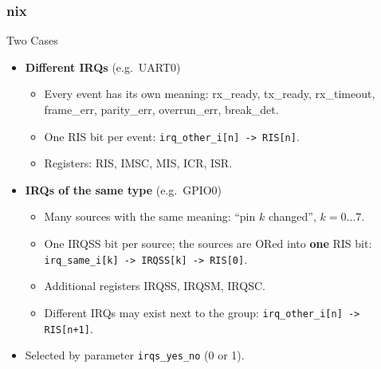 \documentclass{beamer}
\newcommand{\astitle}{nix}
\newcommand{\assubtitle}{nix}
\newcommand{\cmd}[1]{\texttt{#1}}
\begin{document}
\renewcommand{\assubtitle}{Two Cases}
\begin{frame}
\frametitle{\astitle}
\begin{block}{\assubtitle}
  \begin{itemize}
    \item \textbf{Different IRQs} (e.g.\ UART0)
      \begin{itemize}
        \item Every event has its own meaning: rx\_ready, tx\_ready, rx\_timeout,
          frame\_err, parity\_err, overrun\_err, break\_det.
        \item One RIS bit per event: \cmd{irq\_other\_i[n] -> RIS[n]}.
        \item Registers: RIS, IMSC, MIS, ICR, ISR.
      \end{itemize}
    \item \textbf{IRQs of the same type} (e.g.\ GPIO0)
      \begin{itemize}
        \item Many sources with the same meaning: ``pin $k$ changed'', $k = 0\ldots7$.
        \item One IRQSS bit per source; the sources are ORed into \textbf{one} RIS bit:
          \cmd{irq\_same\_i[k] -> IRQSS[k] -> RIS[0]}.
        \item Additional registers IRQSS, IRQSM, IRQSC.
        \item Different IRQs may exist next to the group: \cmd{irq\_other\_i[n] -> RIS[n+1]}.
      \end{itemize}
    \item Selected by parameter \cmd{irqs\_yes\_no} (0 or 1).
  \end{itemize}
\end{block}
\end{frame}
\end{document}
